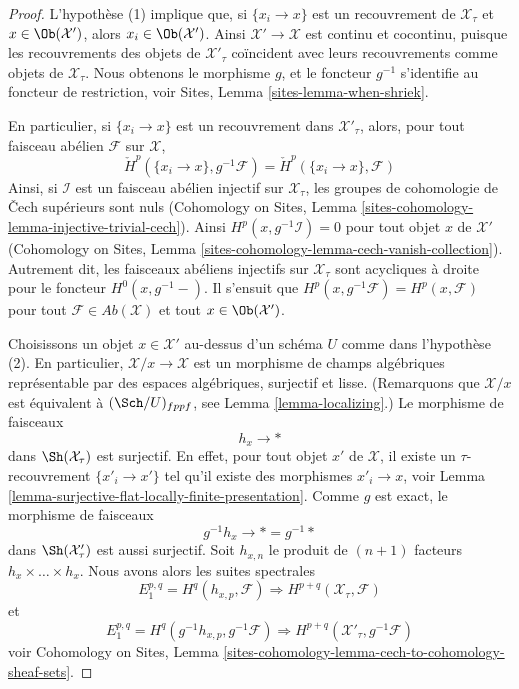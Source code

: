 \begin{proof}
L'hypothèse (1) implique que, si $\{x_i \to x\}$ est un recouvrement
de $\mathcal{X}_\tau$ et $x \in \Ob(\mathcal{X}')$, alors
$x_i \in \Ob(\mathcal{X}')$. Ainsi $\mathcal{X}' \to \mathcal{X}$
est continu et cocontinu, puisque les recouvrements des objets de
$\mathcal{X}'_\tau$ coïncident avec leurs recouvrements comme objets de
$\mathcal{X}_\tau$. Nous obtenons le morphisme $g$, et le foncteur
$g^{-1}$ s'identifie au foncteur de restriction, voir
Sites, Lemma \ref{sites-lemma-when-shriek}.

\medskip\noindent
En particulier, si $\{x_i \to x\}$ est un recouvrement dans $\mathcal{X}'_\tau$,
alors, pour tout faisceau abélien $\mathcal{F}$ sur $\mathcal{X}$,
$$
\check H^p(\{x_i \to x\}, g^{-1}\mathcal{F}) =
\check H^p(\{x_i \to x\}, \mathcal{F})
$$
Ainsi, si $\mathcal{I}$ est un faisceau abélien injectif sur $\mathcal{X}_\tau$,
les groupes de cohomologie de {\v C}ech supérieurs sont nuls
(Cohomology on Sites,
Lemma \ref{sites-cohomology-lemma-injective-trivial-cech}).
Ainsi $H^p(x, g^{-1}\mathcal{I}) = 0$ pour tout objet $x$
de $\mathcal{X}'$
(Cohomology on Sites,
Lemma \ref{sites-cohomology-lemma-cech-vanish-collection}).
Autrement dit, les faisceaux abéliens injectifs sur $\mathcal{X}_\tau$
sont acycliques à droite pour le foncteur $H^0(x, g^{-1}-)$.
Il s'ensuit que $H^p(x, g^{-1}\mathcal{F}) = H^p(x, \mathcal{F})$
pour tout $\mathcal{F} \in \textit{Ab}(\mathcal{X})$ et tout
$x \in \Ob(\mathcal{X}')$.

\medskip\noindent
Choisissons un objet $x \in \mathcal{X}'$ au-dessus d'un schéma $U$
comme dans l'hypothèse (2). En particulier, $\mathcal{X}/x \to \mathcal{X}$
est un morphisme de champs algébriques représentable par des espaces algébriques,
surjectif et lisse. (Remarquons que $\mathcal{X}/x$ est équivalent à
$(\Sch/U)_{fppf}$, see Lemma \ref{lemma-localizing}.)
Le morphisme de faisceaux
$$
h_x \longrightarrow *
$$
dans $\Sh(\mathcal{X}_\tau)$ est surjectif. En effet, pour tout objet $x'$
de $\mathcal{X}$, il existe un $\tau$-recouvrement $\{x'_i \to x'\}$
tel qu'il existe des morphismes $x'_i \to x$, voir
Lemma \ref{lemma-surjective-flat-locally-finite-presentation}.
Comme $g$ est exact, le morphisme de faisceaux
$$
g^{-1}h_x \longrightarrow * = g^{-1}*
$$
dans $\Sh(\mathcal{X}'_\tau)$ est aussi surjectif. Soit $h_{x, n}$ le
produit de $(n + 1)$ facteurs $h_x \times \ldots \times h_x$.
Nous avons alors les suites spectrales
\begin{equation}
\label{equation-spectral-sequence-one}
E_1^{p, q} = H^q(h_{x, p}, \mathcal{F}) \Rightarrow
H^{p + q}(\mathcal{X}_\tau, \mathcal{F})
\end{equation}
et
\begin{equation}
\label{equation-spectral-sequence-two}
E_1^{p, q} = H^q(g^{-1}h_{x, p}, g^{-1}\mathcal{F}) \Rightarrow
H^{p + q}(\mathcal{X}'_\tau, g^{-1}\mathcal{F})
\end{equation}
voir Cohomology on Sites,
Lemma \ref{sites-cohomology-lemma-cech-to-cohomology-sheaf-sets}.


\end{proof}
